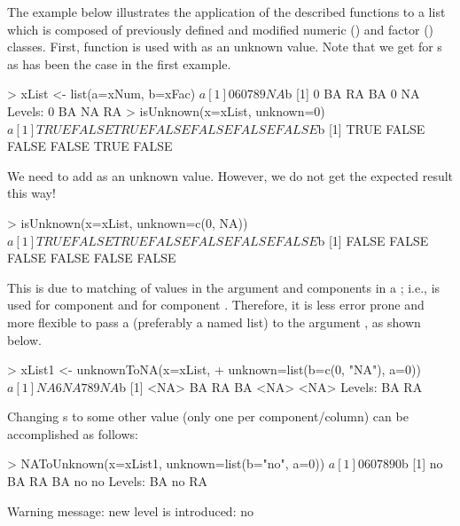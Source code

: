 \documentclass[a4paper]{report}
\begin{document}
\begin{article}
The example below illustrates the application of the
described functions to a list which is
composed of previously defined and modified numeric () and
factor () classes. First, function  is used with
 as an unknown value. Note that we get  for s as
has been the case in the first example.

\begin{smallverbatim}
> xList <- list(a=xNum, b=xFac)
$a
[1]  0  6  0  7  8  9 NA

$b
[1] 0  BA RA BA 0  NA
Levels: 0 BA NA RA
> isUnknown(x=xList, unknown=0)
$a
[1] TRUE FALSE  TRUE FALSE FALSE FALSE FALSE

$b
[1] TRUE FALSE FALSE FALSE  TRUE FALSE
\end{smallverbatim}

We need to add  as an unknown value. However, we do not get the
expected result this way!

\begin{smallverbatim}
> isUnknown(x=xList, unknown=c(0, NA))
$a
[1] TRUE FALSE  TRUE FALSE FALSE FALSE FALSE

$b
[1] FALSE FALSE FALSE FALSE FALSE FALSE
\end{smallverbatim}

This is due to matching of values in the argument  and components
in a ; i.e.,  is used for component  and 
for component .  Therefore, it is less error prone and more
flexible to pass a  (preferably a named list) to the argument
, as shown below.

\begin{smallverbatim}
> xList1 <- unknownToNA(x=xList,
+                       unknown=list(b=c(0, "NA"), a=0))
$a
[1] NA  6 NA  7  8  9 NA

$b
[1] <NA> BA   RA   BA   <NA> <NA>
Levels: BA RA
\end{smallverbatim}

Changing s to some other value (only one per component/column) can
be accomplished as follows:

\begin{smallverbatim}
> NAToUnknown(x=xList1, unknown=list(b="no", a=0))
$a
[1] 0 6 0 7 8 9 0

$b
[1] no BA RA BA no no
Levels: BA no RA

Warning message:
new level is introduced: no
\end{smallverbatim}


\end{article}
\end{document}

